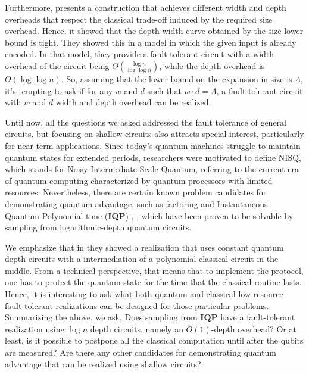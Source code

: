 \documentclass[manuscript,screen,review]{acmart}
\begin{document}
{Furthermore, \cite{10.1007/11672142_44} presents a construction that achieves different width and depth overheads that respect the classical trade-off induced by the required size overhead. Hence, it showed that the depth-width curve obtained by the size lower bound is tight. They showed this in a model in which the given input is already encoded. In that model, they provide a fault-tolerant circuit with a width overhead of the circuit being $\Theta(\frac{\log n}{\log \log n})$, while the depth overhead is $\Theta(\log \log n)$. So, assuming that the lower bound on the expansion in size is $\Lambda$, it's tempting to ask if for any $w$ and $d$ such that $w \cdot d = \Lambda$, a fault-tolerant circuit with $w$ and $d$ width and depth overhead can be realized.


Until now, all the questions we asked addressed the fault tolerance of general circuits, but focusing on shallow circuits also attracts special interest, particularly for near-term applications. Since today's quantum machines struggle to maintain quantum states for extended periods, researchers were motivated to define NISQ, which stands for Noisy Intermediate-Scale Quantum, referring to the current era of quantum computing characterized by quantum processors with limited resources. Nevertheless, there are certain known problem candidates for demonstrating quantum advantage, such as factoring \cite{Shor_1997} and Instantaneous Quantum Polynomial-time (\textbf{IQP}) \cite{Bremner_2017}, \cite{Paletta_2024}, which have been proven to be solvable by sampling from logarithmic-depth quantum circuits.

We emphasize that in \cite{Paletta_2024} they showed a realization that uses constant quantum depth circuits with a intermediation of a polynomial classical circuit in the middle. From a technical perspective, that means that to implement the protocol, one has to protect the quantum state for the time that the classical routine lasts.
Hence, it is interesting to ask what both quantum and classical low-resource fault-tolerant realizations can be designed for those particular problems. Summarizing the above, we ask, Does sampling from $\mathbf{IQP}$ have a fault-tolerant realization using $\log n$ depth circuits, namely an $O(1)$-depth overhead? Or at least, is it possible to postpone all the classical computation until after the qubits are measured? Are there any other candidates for demonstrating quantum advantage that can be realized using shallow circuits?

}
\end{document}
